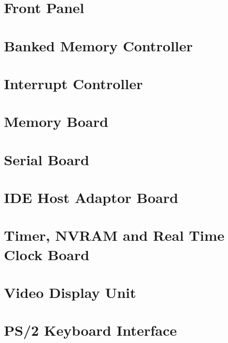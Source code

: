     \chapter{Front Panel}
    \glsresetall
    
  \fi

  \ifdefined\renderchapmbu
    \chapter{Banked Memory Controller}
    \glsresetall
  \fi

  \ifdefined\renderchapirc
    \chapter{Interrupt Controller}
    \glsresetall
    
  \fi

  \ifdefined\renderchapmem
    \chapter{Memory Board}
    \glsresetall
    
  \fi

  \ifdefined\renderchaptty
    \chapter{Serial Board}
    \glsresetall
  \fi

  \ifdefined\renderchapide
    \chapter{IDE Host Adaptor Board}
    \glsresetall
  \fi

  \ifdefined\renderchaptnr
    \chapter{Timer, NVRAM and Real Time Clock Board}
    \glsresetall
  \fi

  \ifdefined\renderchapvdu
    \chapter{Video Display Unit}
    \glsresetall
    
  \fi

  \ifdefined\renderchapkbd
    \chapter{PS/2 Keyboard Interface}
    \glsresetall
    
  \fi

